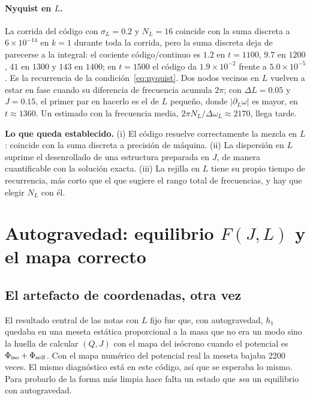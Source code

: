 \documentclass[11pt,a4paper]{article}
\begin{document}
\paragraph{Nyquist en $L$.} La corrida del código con $\sigma_L=0.2$ y $N_L=16$ coincide
con la suma discreta a $6\times10^{-14}$ en $k=1$ durante toda la corrida, pero la suma
discreta deja de parecerse a la integral: el cociente código/continuo es $1.2$ en
$t=1100$, $9.7$ en $1200$, $41$ en $1300$ y $143$ en $1400$; en $t=1500$ el código da
$1.9\times10^{-2}$ frente a $5.0\times10^{-5}$. Es la recurrencia de la
condición~\eqref{eq:nyquist}. Dos nodos vecinos en $L$ vuelven a estar en fase cuando su
diferencia de frecuencia acumula $2\pi$; con $\Delta L=0.05$ y $J=0.15$, el primer par en
hacerlo es el de $L$ pequeño, donde $|\partial_L\omega|$ es mayor, en $t\approx1360$. Un
estimado con la frecuencia media, $2\pi N_L/\Delta\omega_L\approx2170$, llega tarde.

\begin{idea}
\textbf{Lo que queda establecido.} (i) El código resuelve correctamente la mezcla en $L$:
coincide con la suma discreta a precisión de máquina. (ii) La dispersión en $L$ suprime
el desenrollado de una estructura preparada en $J$, de manera cuantificable con la
solución exacta. (iii) La rejilla en $L$ tiene su propio tiempo de recurrencia, más corto
que el que sugiere el rango total de frecuencias, y hay que elegir $N_L$ con él.
\end{idea}

\section{Autogravedad: equilibrio \texorpdfstring{$F(J,L)$}{F(J,L)} y el mapa correcto}
\label{sec:equilibrio}

\subsection{El artefacto de coordenadas, otra vez}

El resultado central de las notas con $L$ fijo fue que, con autogravedad, $h_1$ quedaba
en una meseta estática proporcional a la masa que no era un modo sino la huella de
calcular $(Q,J)$ con el mapa del isócrono cuando el potencial es
$\Phi_{\rm iso}+\Phi_{\rm self}$. Con el mapa numérico del potencial real la meseta bajaba
2200 veces. El mismo diagnóstico está en este código, así que se esperaba lo mismo. Para
probarlo de la forma más limpia hace falta un estado que \emph{sea} un equilibrio con
autogravedad.
\end{document}
